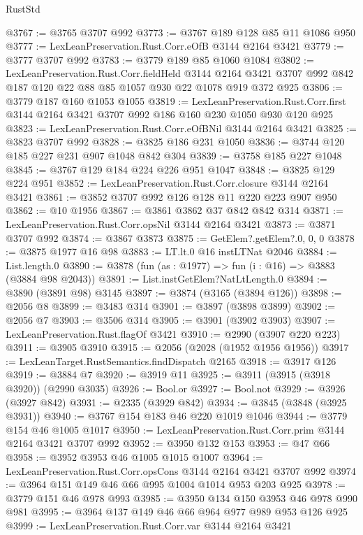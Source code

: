 \begin{lexlean}{RustStd}
\begin{coremodule}
@3767 := @3765 @3707 @992
@3773 := @3767 @189 @128 @85 @11 @1086 @950
@3777 := LexLeanPreservation.Rust.Corr.eOfB @3144 @2164 @3421
@3779 := @3777 @3707 @992
@3783 := @3779 @189 @85 @1060 @1084
@3802 := LexLeanPreservation.Rust.Corr.fieldHeld
    @3144
    @2164
    @3421
    @3707
    @992
    @842
    @187
    @120
    @22
    @88
    @85
    @1057
    @930
    @22
    @1078
    @919
    @372
    @925
@3806 := @3779 @187 @160 @1053 @1055
@3819 := LexLeanPreservation.Rust.Corr.first
    @3144
    @2164
    @3421
    @3707
    @992
    @186
    @160
    @230
    @1050
    @930
    @120
    @925
@3823 := LexLeanPreservation.Rust.Corr.eOfBNil @3144 @2164 @3421
@3825 := @3823 @3707 @992
@3828 := @3825 @186 @231 @1050
@3836 := @3744 @120 @185 @227 @231 @907 @1048 @842 @304
@3839 := @3758 @185 @227 @1048
@3845 := @3767 @129 @184 @224 @226 @951 @1047
@3848 := @3825 @129 @224 @951
@3852 := LexLeanPreservation.Rust.Corr.closure @3144 @2164 @3421
@3861 := @3852 @3707 @992 @126 @128 @11 @220 @223 @907 @950
@3862 := @10 @1956
@3867 := @3861 @3862 @37 @842 @842 @314
@3871 := LexLeanPreservation.Rust.Corr.opsNil @3144 @2164 @3421
@3873 := @3871 @3707 @992
@3874 := @3867 @3873
@3875 := GetElem?.getElem?.{0, 0, 0}
@3878 := @3875 @1977 @16 @98
@3883 := LT.lt.{0} @16 instLTNat @2046
@3884 := List.length.{0}
@3890 := @3878 (fun (as : @1977) => fun (i : @16) => @3883 (@3884 @98 @2043))
@3891 := List.instGetElem?NatLtLength.{0}
@3894 := @3890 (@3891 @98) @3145
@3897 := @3874 (@3165 (@3894 @126))
@3898 := @2056 @8
@3899 := @3483 @314
@3901 := @3897 (@3898 @3899)
@3902 := @2056 @7
@3903 := @3506 @314
@3905 := @3901 (@3902 @3903)
@3907 := LexLeanPreservation.Rust.flagOf @3421
@3910 := @2990 (@3907 @220 @223)
@3911 := @3905 @3910
@3915 := @2056 (@2028 (@1952 @1956 @1956))
@3917 := LexLeanTarget.RustSemantics.findDispatch @2165
@3918 := @3917 @126
@3919 := @3884 @7
@3920 := @3919 @11
@3925 := @3911 (@3915 (@3918 @3920)) (@2990 @3035)
@3926 := Bool.or
@3927 := Bool.not
@3929 := @3926 (@3927 @842)
@3931 := @2335 (@3929 @842)
@3934 := @3845 (@3848 (@3925 @3931))
@3940 := @3767 @154 @183 @46 @220 @1019 @1046
@3944 := @3779 @154 @46 @1005 @1017
@3950 := LexLeanPreservation.Rust.Corr.prim @3144 @2164 @3421 @3707 @992
@3952 := @3950 @132 @153
@3953 := @47 @66
@3958 := @3952 @3953 @46 @1005 @1015 @1007
@3964 := LexLeanPreservation.Rust.Corr.opsCons @3144 @2164 @3421 @3707 @992
@3974 := @3964 @151 @149 @46 @66 @995 @1004 @1014 @953 @203 @925
@3978 := @3779 @151 @46 @978 @993
@3985 := @3950 @134 @150 @3953 @46 @978 @990 @981
@3995 := @3964 @137 @149 @46 @66 @964 @977 @989 @953 @126 @925
@3999 := LexLeanPreservation.Rust.Corr.var @3144 @2164 @3421

\end{coremodule}
\end{lexlean}
